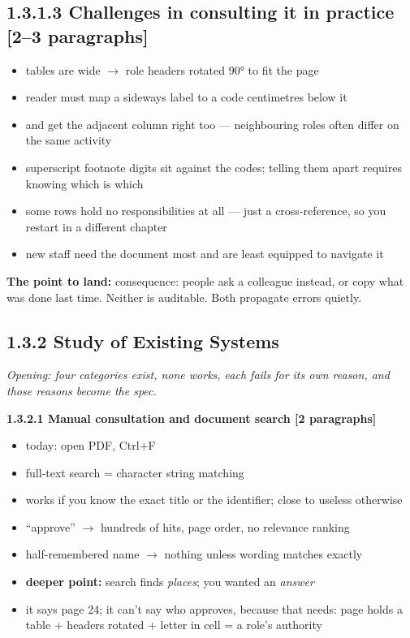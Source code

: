 \documentclass[11pt,a4paper]{article}
\newcommand{\turn}[1]{\par\vspace{3pt}\noindent\textbf{The point to land:} #1\par}
\newcommand{\len}[1]{\hfill\textcolor{gr}{\small[#1]}}
\begin{document}
\subsection*{1.3.1.3 Challenges in consulting it in practice \len{2--3 paragraphs}}
\begin{itemize}
\item tables are wide $\rightarrow$ role headers rotated 90° to fit the page
\item reader must map a sideways label to a code centimetres below it
\item and get the adjacent column right too --- neighbouring roles often differ on the same activity
\item superscript footnote digits sit against the codes; telling them apart requires knowing which is which
\item some rows hold no responsibilities at all --- just a cross-reference, so you
restart in a different chapter
\item new staff need the document most and are least equipped to navigate it
\end{itemize}
\turn{consequence: people ask a colleague instead, or copy what was done last time.
Neither is auditable. Both propagate errors quietly.}

\subsection*{1.3.2 Study of Existing Systems}
\textit{Opening: four categories exist, none works, each fails for its own reason,
and those reasons become the spec.}

\textbf{1.3.2.1 Manual consultation and document search \len{2 paragraphs}}
\begin{itemize}
\item today: open PDF, Ctrl+F
\item full-text search = character string matching
\item works if you know the exact title or the identifier; close to useless otherwise
\item ``approve'' $\rightarrow$ hundreds of hits, page order, no relevance ranking
\item half-remembered name $\rightarrow$ nothing unless wording matches exactly
\item \textbf{deeper point:} search finds \emph{places}; you wanted an \emph{answer}
\item it says page 24; it can't say who approves, because that needs: page holds a
table + headers rotated + letter in cell = a role's authority
\end{itemize}
\end{document}
